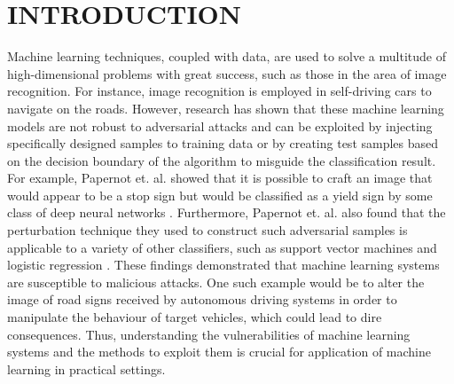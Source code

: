 \section{INTRODUCTION}

Machine learning techniques, coupled with data, are used to solve a multitude of high-dimensional problems with great success, such as those in the area of image recognition. For instance, image recognition is employed in self-driving cars to navigate on the roads. However, research has shown that these machine learning models are not robust to adversarial attacks and can be exploited by injecting specifically designed samples to training data or by creating test samples based on the decision boundary of the algorithm to misguide the classification result. For example, Papernot et. al. showed that it is possible to craft an image that would appear to be a stop sign but would be classified as a yield sign by some class of deep neural networks \cite{papernot1}. Furthermore, Papernot et. al. also found that the perturbation technique they used to construct such adversarial samples is applicable to a variety of other classifiers, such as support vector machines and logistic regression \cite{papernot3}. These findings demonstrated that machine learning systems are susceptible to malicious attacks. One such example would be to alter the image of road signs received by autonomous driving systems in order to manipulate the behaviour of target vehicles, which could lead to dire consequences. Thus, understanding the vulnerabilities of machine learning systems and the methods to exploit them is crucial for application of machine learning in practical settings.